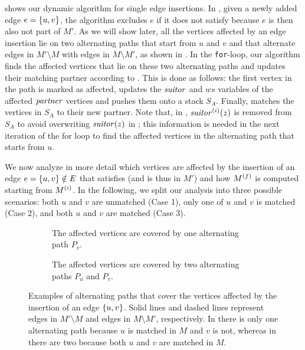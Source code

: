 

 shows our dynamic algorithm for single edge
insertions.
In
, given a newly added edge
$e = \set{u, v}$, the algorithm excludes $e$ if it does not satisfy
 because $e$ is then also not part of $M'$.
As we will show later, all the vertices affected by an edge insertion lie on
two alternating paths that start from $u$ and $v$ and that alternate edges in
$M'\setminus M$ with edges in $M\setminus M'$, as shown in .
In the \texttt{for}-loop, our algorithm finds the affected
vertices that lie on these two alternating paths and updates their matching partner
according to .
This is done as follows: the first vertex in the path is marked as affected,
\findaff updates the $\mathit{suitor}$ and $ws$ variables of the
affected $\mathit{partner}$ vertices and pushes them onto a stack $S_A$. Finally, \updateaff
matches the vertices in $S_A$ to their new partner.
Note that, in , $\mathit{suitor}^{(i)}(z)$
is removed from $S_A$ to avoid overwriting $\mathit{suitor}(z)$ in \updateaff;
this information is needed in the next iteration of the for loop to find the
affected vertices in the alternating path that starts from $u$.

We now analyze in more detail which vertices are affected by the insertion of
an edge $e = \set{u, v} \notin E$ that satisfies
 (and is thus in $M'$) and how $M^{(f)}$
is computed starting from $M^{(i)}$. In the following, we split our analysis
into three possible scenarios: both $u$ and $v$ are unmatched (Case 1), only
one of $u$ and $v$ is matched (Case 2), and both $u$ and $v$ are matched (Case
3).

\begin{figure}[tb]
\centering
\begin{subfigure}[t]{.485\textwidth}
\centering

\caption{The affected vertices are covered by one alternating
path $P_v$.}
\label{fig:dyn-mwm:edge-insertion-pv}
\end{subfigure}\hfill
\begin{subfigure}[t]{.485\textwidth}

\caption{The affected vertices are covered by two alternating paths
$P_u$ and $P_v$.}
\label{fig:dyn-mwm:edge-insertion-pu-pv}
\end{subfigure}

\caption{Examples of alternating paths that cover the vertices affected by the insertion
of an edge $\set{u, v}$.
Solid lines and dashed lines represent edges in $M'\setminus M$ and edges in $M\setminus M'$,
respectively.
In  there is only one
alternating path because $u$ is matched in $M$ and $v$ is not, whereas
in  there are two because both $u$ and
$v$ are matched in $M$.}
\label{fig:dyn-mwm:edge-insertion}
\end{figure}


